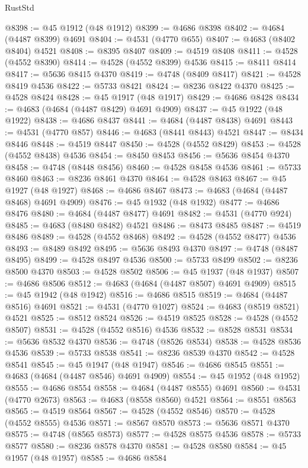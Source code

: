 \begin{lexlean}{RustStd}
\begin{coremodule}
@8398 := @45 @1912 (@48 @1912)
@8399 := @4686 @8398
@8402 := @4684 (@4487 @8399) @4691
@8404 := @4531 (@4770 @655)
@8407 := @4683 (@8402 @8404) @4521
@8408 := @8395 @8407
@8409 := @4519 @8408
@8411 := @4528 (@4552 @8390)
@8414 := @4528 (@4552 @8399) @4536
@8415 := @8411 @8414
@8417 := @5636 @8415 @4370
@8419 := @4748 (@8409 @8417)
@8421 := @4528 @8419 @4536
@8422 := @5733 @8421
@8424 := @8236 @8422 @4370
@8425 := @4528 @8424
@8428 := @45 @1917 (@48 @1917)
@8429 := @4686 @8428
@8434 := @4683 (@4684 (@4487 @8429) @4691 @4909)
@8437 := @45 @1922 (@48 @1922)
@8438 := @4686 @8437
@8441 := @4684 (@4487 @8438) @4691
@8443 := @4531 (@4770 @857)
@8446 := @4683 (@8441 @8443) @4521
@8447 := @8434 @8446
@8448 := @4519 @8447
@8450 := @4528 (@4552 @8429)
@8453 := @4528 (@4552 @8438) @4536
@8454 := @8450 @8453
@8456 := @5636 @8454 @4370
@8458 := @4748 (@8448 @8456)
@8460 := @4528 @8458 @4536
@8461 := @5733 @8460
@8463 := @8236 @8461 @4370
@8464 := @4528 @8463
@8467 := @45 @1927 (@48 @1927)
@8468 := @4686 @8467
@8473 := @4683 (@4684 (@4487 @8468) @4691 @4909)
@8476 := @45 @1932 (@48 @1932)
@8477 := @4686 @8476
@8480 := @4684 (@4487 @8477) @4691
@8482 := @4531 (@4770 @924)
@8485 := @4683 (@8480 @8482) @4521
@8486 := @8473 @8485
@8487 := @4519 @8486
@8489 := @4528 (@4552 @8468)
@8492 := @4528 (@4552 @8477) @4536
@8493 := @8489 @8492
@8495 := @5636 @8493 @4370
@8497 := @4748 (@8487 @8495)
@8499 := @4528 @8497 @4536
@8500 := @5733 @8499
@8502 := @8236 @8500 @4370
@8503 := @4528 @8502
@8506 := @45 @1937 (@48 @1937)
@8507 := @4686 @8506
@8512 := @4683 (@4684 (@4487 @8507) @4691 @4909)
@8515 := @45 @1942 (@48 @1942)
@8516 := @4686 @8515
@8519 := @4684 (@4487 @8516) @4691
@8521 := @4531 (@4770 @1027)
@8524 := @4683 (@8519 @8521) @4521
@8525 := @8512 @8524
@8526 := @4519 @8525
@8528 := @4528 (@4552 @8507)
@8531 := @4528 (@4552 @8516) @4536
@8532 := @8528 @8531
@8534 := @5636 @8532 @4370
@8536 := @4748 (@8526 @8534)
@8538 := @4528 @8536 @4536
@8539 := @5733 @8538
@8541 := @8236 @8539 @4370
@8542 := @4528 @8541
@8545 := @45 @1947 (@48 @1947)
@8546 := @4686 @8545
@8551 := @4683 (@4684 (@4487 @8546) @4691 @4909)
@8554 := @45 @1952 (@48 @1952)
@8555 := @4686 @8554
@8558 := @4684 (@4487 @8555) @4691
@8560 := @4531 (@4770 @2673)
@8563 := @4683 (@8558 @8560) @4521
@8564 := @8551 @8563
@8565 := @4519 @8564
@8567 := @4528 (@4552 @8546)
@8570 := @4528 (@4552 @8555) @4536
@8571 := @8567 @8570
@8573 := @5636 @8571 @4370
@8575 := @4748 (@8565 @8573)
@8577 := @4528 @8575 @4536
@8578 := @5733 @8577
@8580 := @8236 @8578 @4370
@8581 := @4528 @8580
@8584 := @45 @1957 (@48 @1957)
@8585 := @4686 @8584

\end{coremodule}
\end{lexlean}
